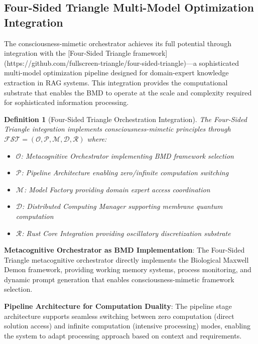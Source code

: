 \documentclass[12pt,a4paper]{article}
\newtheorem{definition}[theorem]{Definition}
\begin{document}
\subsection{Four-Sided Triangle Multi-Model Optimization Integration}

The consciousness-mimetic orchestrator achieves its full potential through integration with the [Four-Sided Triangle framework](https://github.com/fullscreen-triangle/four-sided-triangle)—a sophisticated multi-model optimization pipeline designed for domain-expert knowledge extraction in RAG systems. This integration provides the computational substrate that enables the BMD to operate at the scale and complexity required for sophisticated information processing.

\begin{definition}[Four-Sided Triangle Orchestration Integration]
The Four-Sided Triangle integration implements consciousness-mimetic principles through $\mathcal{FST} = (\mathcal{O}, \mathcal{P}, \mathcal{M}, \mathcal{D}, \mathcal{R})$ where:
\begin{itemize}
\item $\mathcal{O}$: Metacognitive Orchestrator implementing BMD framework selection
\item $\mathcal{P}$: Pipeline Architecture enabling zero/infinite computation switching
\item $\mathcal{M}$: Model Factory providing domain expert access coordination
\item $\mathcal{D}$: Distributed Computing Manager supporting membrane quantum computation
\item $\mathcal{R}$: Rust Core Integration providing oscillatory discretization substrate
\end{itemize}
\end{definition}

\textbf{Metacognitive Orchestrator as BMD Implementation}: The Four-Sided Triangle metacognitive orchestrator directly implements the Biological Maxwell Demon framework, providing working memory systems, process monitoring, and dynamic prompt generation that enables consciousness-mimetic framework selection.

\textbf{Pipeline Architecture for Computation Duality}: The pipeline stage architecture supports seamless switching between zero computation (direct solution access) and infinite computation (intensive processing) modes, enabling the system to adapt processing approach based on context and requirements.
\end{document}

